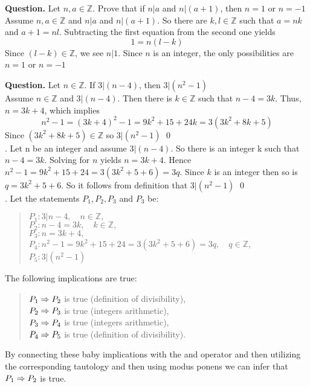 \begin{example}{}
	\textbf{Question.} Let $ n,a \in \mathbb{Z} $. Prove that if $ n|a $ and $ n|(a+1) $, then $ n=1 $ or $ n=-1 $ \\
	
	 Assume $ n,a \in \mathbb{Z} $ and $ n|a $ and $ n|(a+1) $. So there are $ k,l \in \mathbb{Z} $ such that $ a=nk $ and $ a+1 = nl $. Subtracting the first equation from the second one yields
	\[ 1 = n(l-k) \]
	Since $ (l-k) \in \mathbb{Z} $, we see $ n|1 $. Since $ n $ is an integer, the only possibilities are $ n=1 $ or $ n=-1 $
\end{example}

\begin{example}{}
	\textbf{Question.} Let $ n \in \mathbb{Z} $. If $ 3|(n-4) $, then $ 3|(n^2-1) $ \\
	
	 Assume $ n \in \mathbb{Z} $ and $ 3|(n-4) $. Then there is $ k \in  \mathbb{Z} $ such that $ n-4 = 3k $. Thus, $ n=3k+4 $, which implies
	\[ n^2 - 1 = (3k+4)^2 - 1 = 9k^2 + 15 + 24k = 3 (3k^2 + 8k +5)  \]
	Since $ (3k^2 + 8k +5) \in \mathbb{Z} $ so $ 3|(n^2-1) $ \qed \\
	
	. Let n be an integer and assume $ 3|(n-4) $. So there is an integer k such that $ n-4 = 3k $. Solving for $ n $ yields $ n=3k+4 $. Hence $ n^2 - 1 = 9k^2 + 15 + 24 = 3 (3k^2+5+6) = 3q $. Since $ k $ is an integer then so is $ q = 3k^2+5+6 $. So it follows from definition that $ 3|(n^2-1) $ \qed \\
	
	. Let the statements $ P_1, P_2, P_3 $ and $ P_3 $ be:
	\begin{quote}
		$ P_1: 3|n-4, \quad n \in \mathbb{Z}, $ \\
		$ P_2: n-4 = 3k, \quad k \in \mathbb{Z}, $ \\
		$ P_3: n = 3k+4,  $ \\
		$ P_4: n^2-1 = 9k^2 + 15 + 24 = 3 (3k^2+5+6) = 3q, \quad q \in \mathbb{Z} $, \\
		$ P_5: 3|(n^2-1) $
	\end{quote}
	The following implications are true:
	\begin{quote}
		$ P_1 \Rightarrow P_2 $ is true (definition of divisibility), \\
		$ P_2 \Rightarrow P_3 $ is true (integers arithmetic), \\
		$ P_3 \Rightarrow P_4 $ is true (integers arithmetic), \\
		$ P_4 \Rightarrow P_5 $ is true (definition of divisibility).
	\end{quote}
	By connecting these baby implications with the and operator and then utilizing the corresponding tautology and then using modus ponens we can infer that $ P_1 \Rightarrow P_2 $ is true.
\end{example}

